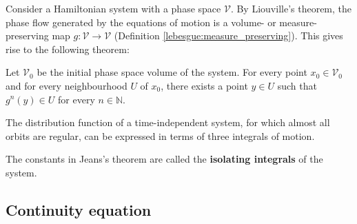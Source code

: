 
    Consider a Hamiltonian system with a phase space $\mathcal{V}$. By Liouville's theorem, the phase flow generated by the equations of motion is a volume- or measure-preserving map $g:\mathcal{V}\rightarrow\mathcal{V}$ (Definition \ref{lebesgue:measure_preserving}). This gives rise to the following theorem:
    \begin{theorem}
        Let $\mathcal{V}_0$ be the initial phase space volume of the system. For every point $x_0\in\mathcal{V}_0$ and for every neighbourhood $U$ of $x_0$, there exists a point $y\in U$ such that $g^n(y)\in U$ for every $n\in\mathbb{N}$.
    \end{theorem}

    \begin{theorem}
        The distribution function of a time-independent system, for which almost all orbits are regular, can be expressed in terms of three integrals of motion.
    \end{theorem}
    The constants in Jeans's theorem are called the \textup{\textbf{isolating integrals}} of the system.

\subsection{Continuity equation}

